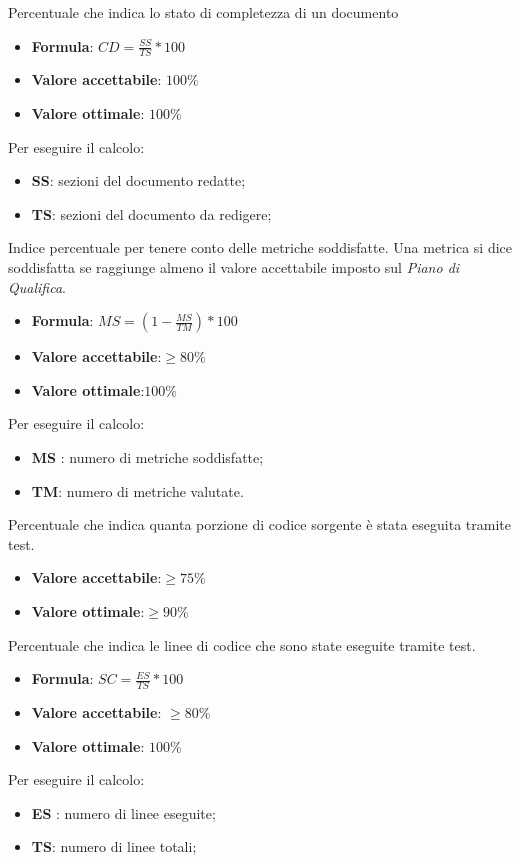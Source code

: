 Percentuale che indica lo stato di completezza di un documento
\begin{itemize}
    \item \textbf{Formula}: $CD=\frac{SS}{TS}*100$
    \item \textbf{Valore accettabile}: $100\%$
    \item \textbf{Valore ottimale}: $100\%$
\end{itemize} 
Per eseguire il calcolo:
\begin{itemize}
    \item \textbf{SS}: sezioni del documento redatte;
    \item \textbf{TS}: sezioni del documento da redigere;
\end{itemize} 


Indice percentuale per tenere conto delle metriche soddisfatte. Una
metrica si dice soddisfatta se raggiunge almeno il valore accettabile imposto sul \textit{Piano di Qualifica}.
\begin{itemize}
    \item \textbf{Formula}: $MS = (1 - \frac{MS}{TM})*100$
    \item \textbf{Valore accettabile}:$\geq80\%$
    \item \textbf{Valore ottimale}:$100\%$
\end{itemize}  
Per eseguire il calcolo:
\begin{itemize}
    \item \textbf{MS} : numero di metriche soddisfatte;
    \item \textbf{TM}: numero di metriche valutate.
\end{itemize}

Percentuale che indica quanta porzione di codice sorgente è stata eseguita tramite test.
\begin{itemize}
    \item \textbf{Valore accettabile}:$\geq75\%$
    \item \textbf{Valore ottimale}:$\geq90\%$
\end{itemize} 

Percentuale che indica le linee di codice che sono state eseguite tramite test.
\begin{itemize}
    \item \textbf{Formula}: $SC = \frac{ES}{TS}*100$
    \item \textbf{Valore accettabile}: $\geq80\%$
    \item \textbf{Valore ottimale}: $100\%$
\end{itemize}  
Per eseguire il calcolo:
\begin{itemize}
    \item \textbf{ES} : numero di linee eseguite;
    \item \textbf{TS}: numero di linee totali;
\end{itemize}

